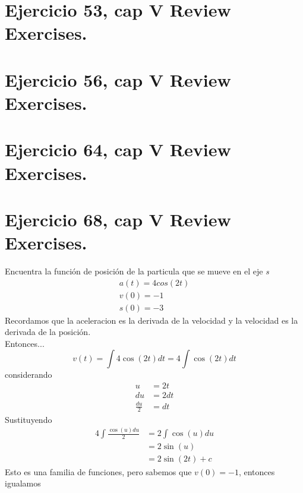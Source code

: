 \documentclass[11pt,letterpaper]{article}
\begin{document}
\section{Ejercicio 53, cap V Review Exercises.}

\section{Ejercicio 56, cap V Review Exercises.}

\section{Ejercicio 64, cap V Review Exercises.}

\section{Ejercicio 68, cap V Review Exercises.}
Encuentra la función de posición de la particula que se mueve en el eje \textit{s}
\begin{equation*}
  \begin{split}
    a(t)=4cos(2t)\\
    v(0)=-1\\
    s(0)=-3
  \end{split}
\end{equation*}
Recordamos que la aceleracion es la derivada de la velocidad y la velocidad es la derivada de la posición.\\
Entonces...
\begin{equation*}
  v(t)=\int 4\cos(2t)dt = 4 \int \cos(2t)dt
\end{equation*}
considerando
\begin{equation*}
  \begin{split}
    u &= 2t\\
    du &= 2dt\\
    \frac{du}{2} &= dt
  \end{split}
\end{equation*}
Sustituyendo
\begin{equation*}
  \begin{split}
    4 \int \frac{\cos(u)du}{2} &= 2\int\cos(u)du\\
    &= 2\sin(u)\\
    &= 2\sin(2t)+c
  \end{split}
\end{equation*}
Esto es una familia de funciones, pero sabemos que $v(0)=-1$, entonces igualamos
\end{document}
